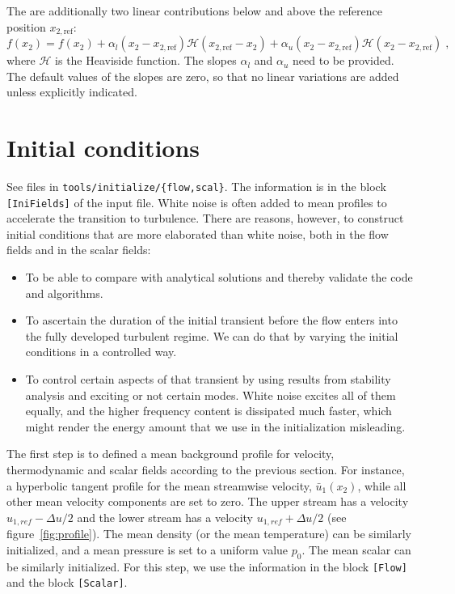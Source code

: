 The are additionally two linear contributions below and above the reference position $x_{2,\text{ref}}$:
\begin{equation}
    f(x_2) = f(x_2)  +\alpha_l (x_2-x_{2,\text{ref}}) \mathcal{H}(x_{2,\text{ref}}-x_2)+\alpha_u (x_2-x_{2,\text{ref}}) \mathcal{H}(x_2-x_{2,\text{ref}})\;,
\end{equation}
where $\mathcal{H}$ is the Heaviside function. The slopes $\alpha_l$ and $\alpha_u$ need to be provided. The default values of the slopes are zero, so that no linear variations are added unless explicitly indicated.

\section{Initial conditions}

See files in \texttt{tools/initialize/\{flow,scal\}}. The information is in the block \texttt{[IniFields]} of the input file. White noise is often added to mean profiles to accelerate the transition to turbulence. There are reasons, however, to construct initial conditions that are more elaborated than white noise, both in the flow fields and in the scalar fields:
\begin{itemize}
    \item To be able to compare with analytical solutions and thereby validate the code and algorithms.
    \item To ascertain the duration of the initial transient before the flow enters into the fully developed turbulent regime. We can do that by varying the initial conditions in a controlled way.
    \item To control certain aspects of that transient by using results from stability analysis and exciting or not certain modes. White noise excites all of them equally, and the higher frequency content is dissipated much faster, which might render the energy amount that we use in the initialization misleading. %
\end{itemize}

The first step is to defined a mean background profile for velocity, thermodynamic and scalar fields according to the previous section. For instance, a hyperbolic tangent profile for the mean streamwise velocity, $\bar{u}_1(x_2)$, while all other mean velocity components are set to zero.  The upper stream has a velocity $u_{1,ref}-\Delta u/2$ and the lower stream has a velocity $u_{1,ref}+\Delta u/2$ (see figure~\ref{fig:profile}). The mean density (or the mean temperature) can be similarly initialized, and a mean pressure is set to a uniform value $p_0$. The mean scalar can be similarly initialized. For this step, we use the information in the block \texttt{[Flow]} and the block \texttt{[Scalar]}.


